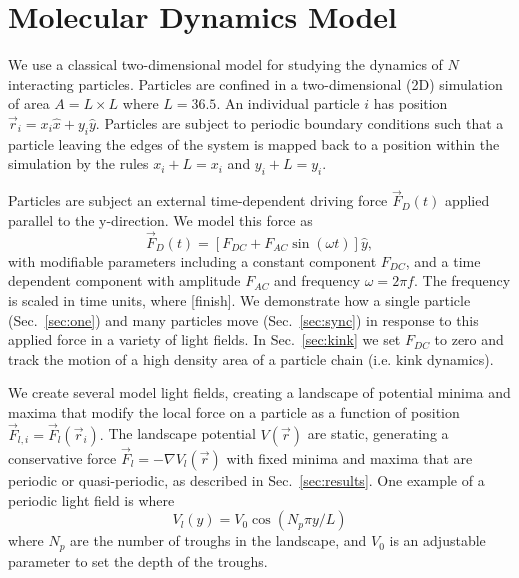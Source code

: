 \documentclass[prb,preprint]{revtex4}
\begin{document}

\section{Molecular Dynamics Model}
\label{sec:MD}
We use a classical two-dimensional model for 
studying the dynamics of $N$ interacting particles. 
Particles are confined in a two-dimensional (2D) 
simulation of area $A = L \times L$ where $L=36.5$.
An individual particle $i$ has
position $\vec{r}_i = x_i \hat{x} + y_i \hat{y}$.
Particles are subject to
periodic boundary conditions
such that a particle leaving the edges of the system is mapped
back to a position within the simulation 
by the rules $x_i+L=x_i$ and $y_i+L=y_i$.

Particles are subject an external time-dependent driving force
$\vec{F}_{D}(t)$
applied parallel to the y-direction.
We model this force as
\begin{equation}
\vec{F}_{D}(t) = [F_{DC} + F_{AC} \sin(\omega t)] \hat{y},
\end{equation}
with modifiable parameters including
a constant component $F_{DC}$,
and a time dependent component with amplitude $F_{AC}$
and frequency $\omega = 2 \pi f$.
The frequency is scaled in time units,
where [finish].
 We demonstrate how a single particle (Sec.~\ref{sec:one})
 and many particles
 move (Sec.~\ref{sec:sync})
 in response to this applied force in a variety of light fields.
 In Sec.~\ref{sec:kink} we set $F_{DC}$
 to zero and track the motion
 of a high density area of a particle chain
 (i.e. kink dynamics).

 We create several model light fields,
 creating a landscape of potential minima and maxima
 that modify the local force on a particle as a function of position
 $\vec{F}_{l,i} = \vec{F}_{l}(\vec{r}_i).$
 The landscape potential $V(\vec{r}) $ are static,
 generating a conservative force $\vec{F}_l= -\nabla V_l(\vec{r})$
 with fixed minima and maxima
 that are periodic or quasi-periodic,
 as described in Sec.~\ref{sec:results}. 
 One example of a periodic light field is
 where 
 \begin{equation}
   V_l(y) = V_0 \cos{(N_p \pi y / L)}
 \end{equation}
 where $N_p$ are the number of troughs in the landscape,
 and $V_0$ is an adjustable parameter
 to set the depth of the troughs.
\end{document}
